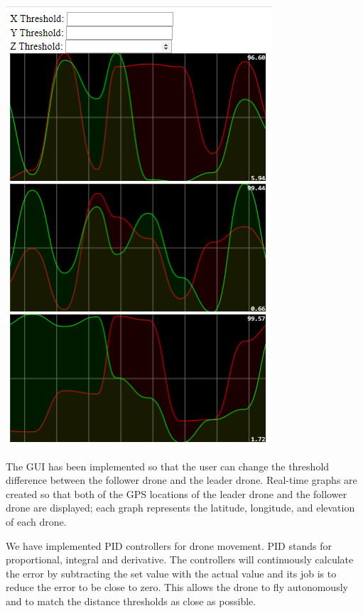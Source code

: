 \documentclass[landscape,a0paper,fontscale=0.35]{baposter} %
\begin{document}
\begin{poster}
{\begin{multicols}{2}
\vspace{1em}
\begin{center}
\includegraphics[scale=0.3]{GUI}
\end{center}

The GUI has been implemented so that the user can change the threshold difference between the follower drone and the leader drone.  Real-time graphs are created so that both of the GPS locations of the leader drone and the follower drone are displayed; each graph represents the latitude, longitude, and elevation of each drone. 
\end{multicols}


\begin{multicols}{2}
\vspace{1em}

We have implemented PID controllers for drone movement. PID stands for proportional, integral and derivative. The controllers will
continuously calculate the error by subtracting the set value with the actual value and its job is to reduce the error to be close to zero.
This allows the drone to fly autonomously and to match the distance thresholds as close as possible.


\end{multicols}}
\end{poster}
\end{document}
